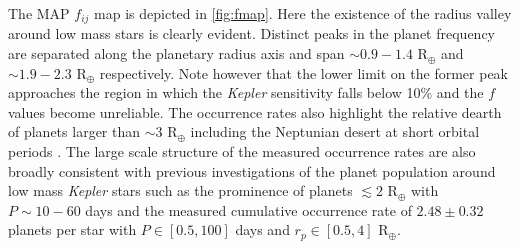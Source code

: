 \documentclass[twocolumn]{emulateapj}
\newcommand{\kepler}[1]{\emph{Kepler}#1}
\begin{document}
The MAP $f_{ij}$ map is depicted in \autoref{fig:fmap}.
Here the existence of the radius valley around low mass stars is clearly
evident. Distinct peaks in the planet frequency are separated along the planetary radius axis and span
$\sim 0.9-1.4$ R$_{\oplus}$ and $\sim 1.9-2.3$ R$_{\oplus}$ respectively.
Note however that the lower limit on the former peak 
approaches the region in which the \kepler{} sensitivity falls below 10\% and the $f$ values become
unreliable.
The occurrence rates also highlight the relative dearth of planets larger than $\sim 3$ R$_{\oplus}$
including the Neptunian desert at short orbital periods \citep{lundkvist16,mazeh16}. The large scale
structure of the measured occurrence rates are also broadly consistent with previous investigations
of the planet population around low mass \kepler{} stars \citep{morton14,dressing15a,gaidos16} such
as the prominence of planets $\lesssim 2$ R$_{\oplus}$ with $P \sim 10-60$ days and the measured
cumulative occurrence rate of $2.48\pm 0.32$ planets per star with $P\in [0.5,100]$ days and
$r_p\in [0.5,4]$ R$_{\oplus}$.
\end{document}

